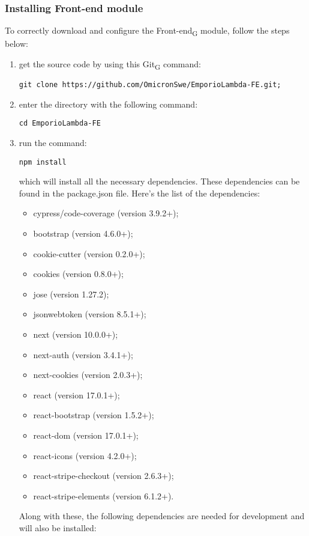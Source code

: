 \subsubsection{Installing Front-end module}
To correctly download and configure the Front-end\textsubscript{G} module, follow the steps below:
\begin{enumerate}
\item get the source code by using this Git\textsubscript{G} command:\begin{center}\texttt{git clone https://github.com/OmicronSwe/EmporioLambda-FE.git;}\end{center}
\item enter the directory with the following command:\begin{center}\texttt{cd EmporioLambda-FE}\end{center}
\item run the command:\begin{center}\texttt{npm install}\end{center}which will install all the necessary dependencies. These dependencies can be found in the package.json file.\newline{} Here's the list of the dependencies:
\begin{itemize}
\item cypress/code-coverage (version 3.9.2+);
\item bootstrap (version 4.6.0+);
\item cookie-cutter (version 0.2.0+);
\item cookies (version 0.8.0+);
\item jose (version 1.27.2);
\item jsonwebtoken (version 8.5.1+);
\item next (version 10.0.0+);
\item next-auth (version 3.4.1+);
\item next-cookies (version 2.0.3+);
\item react (version 17.0.1+);
\item react-bootstrap (version 1.5.2+);
\item react-dom (version 17.0.1+);
\item react-icons (version 4.2.0+);
\item react-stripe-checkout (version 2.6.3+);
\item react-stripe-elements (version 6.1.2+).
\end{itemize}
Along with these, the following dependencies are needed for development and will also be installed:

\end{enumerate}
